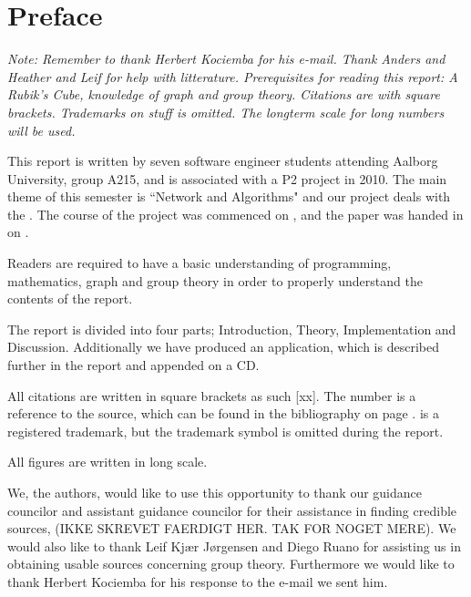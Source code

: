 \chapter*{Preface}
\textit{Note: Remember to thank Herbert Kociemba for his e-mail. Thank Anders and Heather and Leif for help with litterature. Prerequisites for reading this report: A Rubik's Cube, knowledge of graph and group theory. Citations are with square brackets. Trademarks on stuff is omitted. The longterm scale for long numbers will be used.}

This report is written by seven software engineer students attending Aalborg University, group A215, and is associated with a P2 project in 2010.
The main theme of this semester is ``Network and Algorithms" and our project deals with the \rubik{}.
The course of the project was commenced on , and the paper was handed in on .

Readers are required to have a basic understanding of programming, mathematics, graph and group theory in order to properly understand the contents of the report. 

The report is divided into four parts; Introduction, Theory, Implementation and Discussion. 
Additionally we have produced an application, which is described further in the report and appended on a CD.

All citations are written in square brackets as such [xx]. The number is a reference to the source, which can be found in the bibliography on page \pageref{chap:bib}. 
\rubik{} is a registered trademark, but the trademark symbol is omitted during the report.

All figures are written in long scale.%

We, the authors, would like to use this opportunity to thank our guidance councilor and assistant guidance councilor for their assistance in finding credible sources, (IKKE SKREVET FAERDIGT HER. TAK FOR NOGET MERE).
We would also like to thank Leif Kj\ae{}r J\o{}rgensen and Diego Ruano for assisting us in obtaining usable sources concerning group theory.
Furthermore we would like to thank Herbert Kociemba for his response to the e-mail we sent him.
